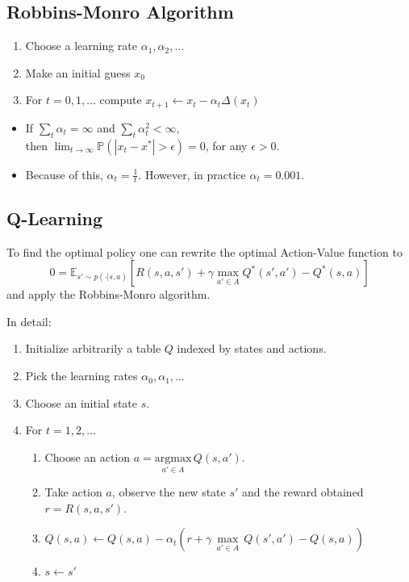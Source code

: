 \subsection{Robbins-Monro Algorithm}

\begin{enumerate}
    \item Choose a learning rate $\alpha_1, \alpha_2, \ldots$
    \item Make an initial guess $x_0$
    \item For $t={0,1,\ldots}$ compute $x_{t+1} \leftarrow x_t - \alpha_t \Delta(x_t)$
\end{enumerate}

\newpar{}
\begin{itemize}
    \item If $\sum_{t}\alpha_t = \infty$ and $\sum_{t}\alpha^2_t<\infty$, \\ then $\lim_{t\to\infty}\mathbb{P}(|x_t - x^*|>\epsilon) = 0$, for any $\epsilon > 0$.
    \item Because of this, $\alpha_t = \frac{1}{t}$. However, in practice $\alpha_t = 0.001$.
\end{itemize}

\subsection{Q-Learning}

To find the optimal policy one can rewrite the optimal Action-Value function to
\begin{equation*}
    0 = \mathbb{E}_{s'\sim p(\cdot|s,a)}\left[R(s,a,s') + \gamma \max_{a'\in A}Q^* (s',a') - Q^*(s,a)\right]
\end{equation*}
and apply the Robbins-Monro algorithm.


\newpar{}
In detail:
\begin{enumerate}
    \item Initialize arbitrarily a table $Q$ indexed by states and actions.
    \item Pick the learning rates $\alpha_0, \alpha_1, \ldots$
    \item Choose an initial state $s$.
    \item For $t = 1, 2, \ldots$
          \begin{enumerate}
              \item Choose an action $a = \underset{a'\in A}{\mathrm{argmax}}\,Q(s,a')$.
              \item Take action $a$, observe the new state $s'$ and the reward obtained $r=R(s,a,s')$.
              \item $Q(s,a) \leftarrow Q(s,a) - \alpha_t \left(r + \gamma\,\underset{a'\in A}{\max}\,Q(s',a')-Q(s,a)\right)$
              \item $s \leftarrow s'$
          \end{enumerate}
\end{enumerate}

